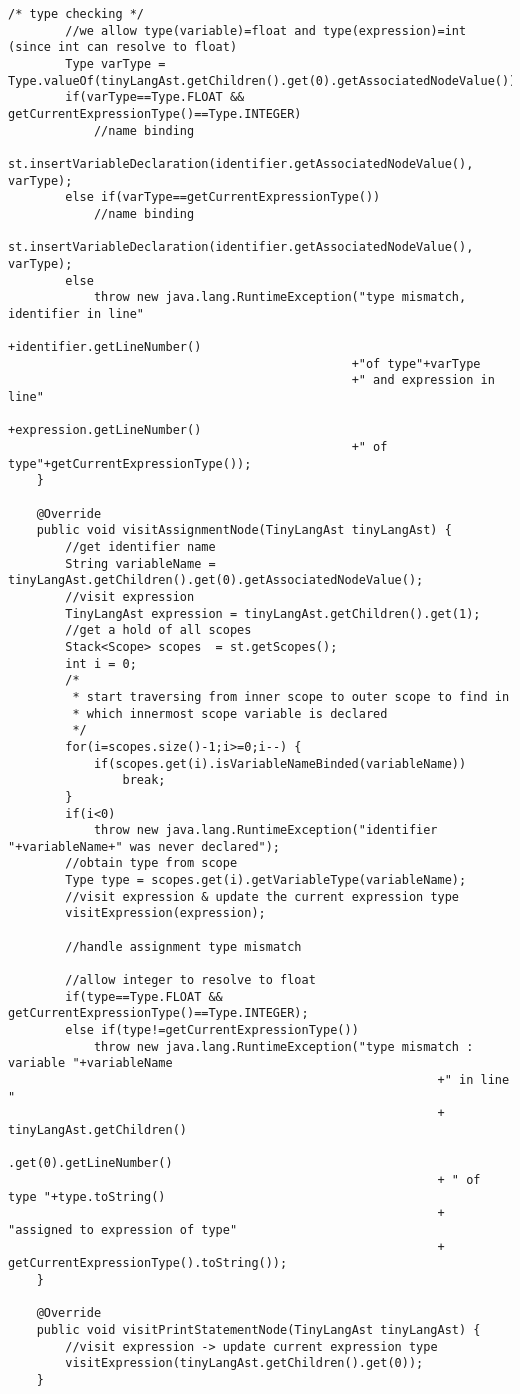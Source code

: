 \begin{lstlisting}[basicstyle=\miniscule,caption=Semantic Analyser,label=listing:semanticanalyser]
		/* type checking */
		//we allow type(variable)=float and type(expression)=int (since int can resolve to float)
		Type varType = Type.valueOf(tinyLangAst.getChildren().get(0).getAssociatedNodeValue());
		if(varType==Type.FLOAT && getCurrentExpressionType()==Type.INTEGER) 
			//name binding
			st.insertVariableDeclaration(identifier.getAssociatedNodeValue(), varType);
		else if(varType==getCurrentExpressionType())
			//name binding
			st.insertVariableDeclaration(identifier.getAssociatedNodeValue(), varType);
		else
			throw new java.lang.RuntimeException("type mismatch, identifier in line"
												+identifier.getLineNumber()
												+"of type"+varType
												+" and expression in line"
												+expression.getLineNumber()
												+" of type"+getCurrentExpressionType());
	}

	@Override
	public void visitAssignmentNode(TinyLangAst tinyLangAst) {
		//get identifier name
		String variableName = tinyLangAst.getChildren().get(0).getAssociatedNodeValue();
		//visit expression
		TinyLangAst expression = tinyLangAst.getChildren().get(1);
		//get a hold of all scopes
		Stack<Scope> scopes  = st.getScopes();
		int i = 0;
		/*
		 * start traversing from inner scope to outer scope to find in
		 * which innermost scope variable is declared
		 */
		for(i=scopes.size()-1;i>=0;i--) {
			if(scopes.get(i).isVariableNameBinded(variableName))
				break;
		}
		if(i<0)
			throw new java.lang.RuntimeException("identifier "+variableName+" was never declared");
		//obtain type from scope 
		Type type = scopes.get(i).getVariableType(variableName);
		//visit expression & update the current expression type
		visitExpression(expression);
		
		//handle assignment type mismatch
		
		//allow integer to resolve to float
		if(type==Type.FLOAT && getCurrentExpressionType()==Type.INTEGER);
		else if(type!=getCurrentExpressionType())
			throw new java.lang.RuntimeException("type mismatch : variable "+variableName
															+" in line "
															+  tinyLangAst.getChildren()
															.get(0).getLineNumber()
															+ " of type "+type.toString()
															+ "assigned to expression of type"
															+ getCurrentExpressionType().toString());
	}

	@Override
	public void visitPrintStatementNode(TinyLangAst tinyLangAst) {
		//visit expression -> update current expression type
		visitExpression(tinyLangAst.getChildren().get(0));
	}


\end{lstlisting}
